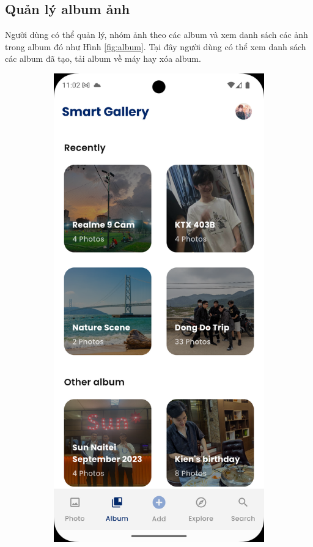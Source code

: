 \subsection{Quản lý album ảnh}

Người dùng có thể quản lý, nhóm ảnh theo các album và xem danh sách các ảnh trong album đó như Hình \ref{fig:album}. Tại đây người dùng có thể xem danh sách các album đã tạo, tải album về máy hay xóa album.

\begin{figure}[H]
    \centering
    \begin{subfigure}{0.48\textwidth}
        \includegraphics[width=1\linewidth]{figures/c4/4-2/album_1.png} 

\end{subfigure}
\end{figure}
